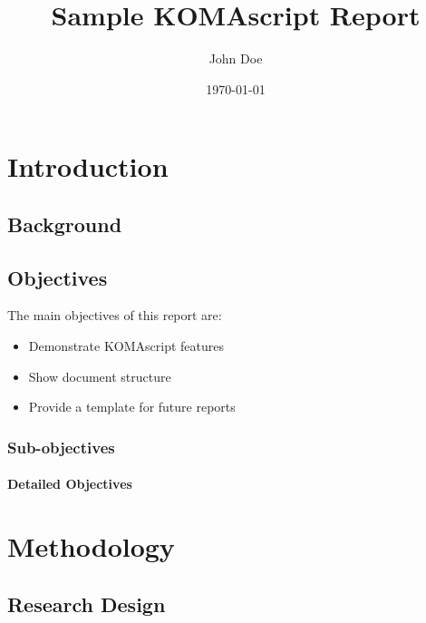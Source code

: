\documentclass{scrreprt}
\title{Sample KOMAscript Report}
\author{John Doe}
\date{\today}
\begin{document}
\maketitle

\tableofcontents
\clearpage

\chapter{Introduction}
\blindtext[2]

\section{Background}
\blindtext

\section{Objectives}
The main objectives of this report are:
\begin{itemize}
  \item Demonstrate KOMAscript features
  \item Show document structure
  \item Provide a template for future reports
\end{itemize}

\subsection{Sub-objectives}
\subsubsection{Detailed Objectives}

\chapter{Methodology}
\blindtext[2]

\section{Research Design}
\blindtext
\end{document}
